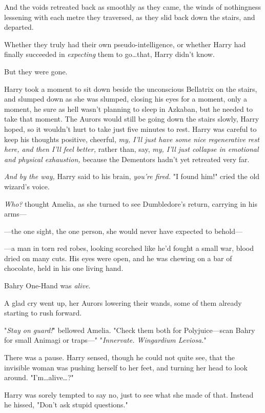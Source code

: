 And the voids retreated back as smoothly as they came, the winds of nothingness
lessening with each metre they traversed, as they slid back down the stairs,
and departed.

Whether they truly had their own pseudo-intelligence, or whether Harry had
finally succeeded in \emph{expecting} them to go…that, Harry didn't
know.

But they were gone.

Harry took a moment to sit down beside the unconscious Bellatrix on the stairs,
and slumped down as she was slumped, closing his eyes for a moment, only a
moment, he sure as hell wasn't planning to sleep in Azkaban, but he needed to
take that moment. The Aurors would still be going down the stairs slowly, Harry
hoped, so it wouldn't hurt to take just five minutes to rest. Harry was careful
to keep his thoughts positive, cheerful, \emph{my, I'll just have some nice
regenerative rest here, and then I'll feel better,} rather than, say, \emph{my,
I'll just collapse in emotional and physical exhaustion,} because the Dementors
hadn't yet retreated very far.

\emph{And by the way,} Harry said to his brain, \emph{you're fired.}
\later
"I found him!" cried the old wizard's voice.

\emph{Who?} thought Amelia, as she turned to see Dumbledore's return, carrying
in his arms---

---the one sight, the one person, she would never have expected to behold---

---a man in torn red robes, looking scorched like he'd fought a small war,
blood dried on many cuts. His eyes were open, and he was chewing on a bar of
chocolate, held in his one living hand.

Bahry One-Hand was \emph{alive.}

A glad cry went up, her Aurors lowering their wands, some of them already
starting to rush forward.

"\emph{Stay on guard!}" bellowed Amelia. "Check them both for Polyjuice---scan
Bahry for small Animagi or traps---"
\later
"\emph{Innervate. Wingardium Leviosa.}"

There was a pause. Harry sensed, though he could not quite see, that the
invisible woman was pushing herself to her feet, and turning her head to look
around. "I'm…alive…?"

Harry was sorely tempted to say no, just to see what she made of that. Instead
he hissed, "Don't ask stupid questions."

